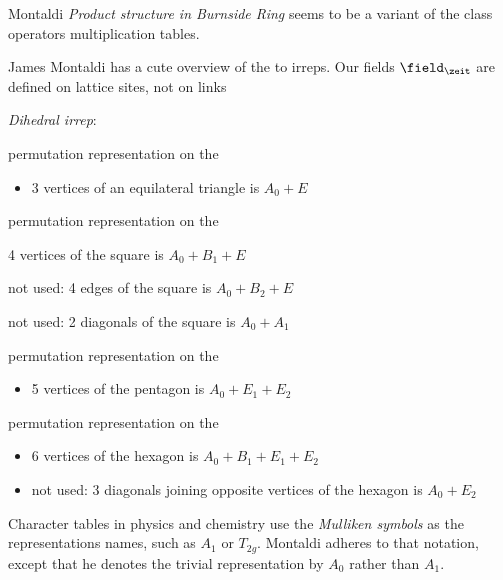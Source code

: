 \begin{description}
Montaldi  {\em Product structure in Burnside Ring} seems to be a variant of
the class operators multiplication tables.

\item[2021-06-21 Predrag]
 {James Montaldi}
has a cute overview of the  to  irreps. Our fields $\field_\zeit$
are defined on \cl{} lattice sites, not on links

{{\em Dihedral irrep}}:

\begin{table}
 {permutation representation} on the
\begin{itemize}
  \item
3 vertices of an equilateral triangle is $A_0+E$
\end{itemize}

 permutation representation on the
\begin{itemize}
  \item
4 vertices of the square is $A_0+B_1+E$
  \item
{\small not used:
4 edges of the square is $A_0+B_2+E$
  \item
not used: 2 diagonals of the square is $A_0+A_1$
}
\end{itemize}

 permutation representation on the
\begin{itemize}
  \item
5 vertices of the pentagon is $A_0+E_1+E_2$
\end{itemize}

 permutation representation on the
\begin{itemize}
  \item
6 vertices of the hexagon is $A_0+ B_1+ E_1+ E_2$
  \item
not used: 3 diagonals joining opposite vertices of the hexagon is $A_0+E_2$
\end{itemize}
  \caption{
\Dn{\cl{}} {permutation representation} irreps
(from 
{J. Montaldi}).
            }
\label{tab:DnPermutReps}
\end{table}

\item[2021-06-21 Predrag]
Character tables in physics and chemistry use the {\em Mulliken symbols} as
the representations names, such as $A_1$ or $T_{2g}$. Montaldi adheres to
that notation, except that he denotes the trivial representation by $A_0$
rather than $A_1$.


\end{description}
